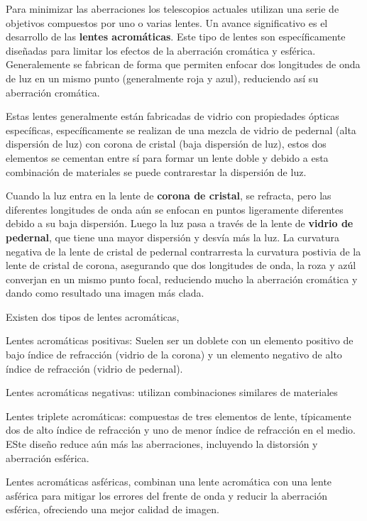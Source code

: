 Para minimizar las aberraciones los telescopios actuales utilizan una serie de objetivos compuestos por uno o varias lentes. Un avance significativo es el desarrollo de las \textbf{lentes acromáticas}. Este tipo de lentes son específicamente diseñadas para limitar los efectos de la aberración cromática y esférica. Generalemente se fabrican de forma que permiten enfocar dos longitudes de onda de luz en un mismo punto (generalmente roja y azul), reduciendo así su aberración cromática. 

Estas lentes generalmente están fabricadas de vidrio con propiedades ópticas específicas, específicamente se realizan de una mezcla de vidrio de pedernal (alta dispersión de luz) con corona de cristal (baja dispersión de luz), estos dos elementos se cementan entre sí para formar un lente doble y debido a esta combinación de materiales se puede contrarestar la dispersión de luz.

Cuando la luz entra en la lente de \textbf{corona de cristal}, se refracta, pero las diferentes longitudes de onda aún se enfocan en puntos ligeramente diferentes debido a su baja dispersión. Luego la luz pasa a través de la lente de \textbf{vidrio de pedernal}, que tiene una mayor dispersión y desvía más la luz. La curvatura negativa de la lente de cristal de pedernal contrarresta la curvatura postivia de la lente de cristal de corona, asegurando que dos longitudes de onda, la roza y azúl converjan en un mismo punto focal, reduciendo mucho la aberración cromática y dando como resultado una imagen más clada.

Existen dos tipos de lentes acromáticas, 

Lentes acromáticas positivas: Suelen ser un doblete con un elemento positivo de bajo índice de refracción (vidrio de la corona) y un elemento negativo de alto índice de refracción (vidrio de pedernal).

Lentes acromáticas negativas: utilizan combinaciones similares de materiales

Lentes triplete acromáticas: compuestas de tres elementos de lente, típicamente dos de alto índice de refracción y uno de menor índice de refracción en el medio. ESte diseño reduce aún más las aberraciones, incluyendo la distorsión y aberración esférica. 

Lentes acromáticas asféricas, combinan una lente acromática con una lente asférica para mitigar los errores del frente de onda y reducir la aberración esférica, ofreciendo una mejor calidad de imagen. 



